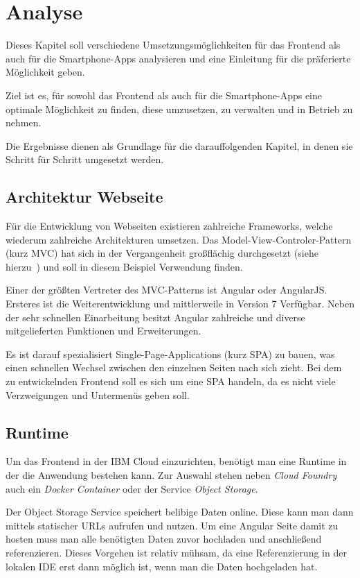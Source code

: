 \section{Analyse}
Dieses Kapitel soll verschiedene Umsetzungsmöglichkeiten für das Frontend als auch für die Smartphone-Apps analysieren
und eine Einleitung für die präferierte Möglichkeit geben.

Ziel ist es, für sowohl das Frontend als auch für die Smartphone-Apps eine optimale Möglichkeit zu finden, diese
umzusetzen, zu verwalten und in Betrieb zu nehmen.

Die Ergebnisse dienen als Grundlage für die darauffolgenden Kapitel, in denen sie Schritt für Schritt umgesetzt werden.

\subsection{Architektur Webseite}
Für die Entwicklung von Webseiten existieren zahlreiche Frameworks, welche wiederum zahlreiche Architekturen umsetzen.
Das Model-View-Controler-Pattern (kurz MVC) hat sich in der Vergangenheit großflächig durchgesetzt (siehe
hierzu~\cite{book_grundlagen_mvc}) und soll in diesem Beispiel Verwendung finden.

Einer der größten Vertreter des MVC-Patterns ist Angular oder AngularJS. Ersteres ist die Weiterentwicklung und
mittlerweile in Version 7 Verfügbar. Neben der sehr schnellen Einarbeitung besitzt Angular zahlreiche und diverse
mitgelieferten Funktionen und Erweiterungen.

Es ist darauf spezialisiert Single-Page-Applications (kurz SPA) zu bauen, was einen schnellen Wechsel zwischen den
einzelnen Seiten nach sich zieht. Bei dem zu entwickelnden Frontend soll es sich um eine SPA handeln, da es nicht viele
Verzweigungen und Untermenüs geben soll.

\subsection{Runtime}
Um das Frontend in der IBM Cloud einzurichten, benötigt man eine Runtime in der die Anwendung bestehen kann. Zur
Auswahl stehen neben \textit{Cloud Foundry} auch ein \textit{Docker Container} oder der Service \textit{Object Storage}.

Der Object Storage Service speichert belibige Daten online. Diese kann man dann mittels statischer URLs aufrufen und
nutzen. Um eine Angular Seite damit zu hosten muss man alle benötigten Daten zuvor hochladen und anschließend
referenzieren. Dieses Vorgehen ist relativ mühsam, da eine Referenzierung in der lokalen IDE erst dann möglich ist, wenn
man die Daten hochgeladen hat.

